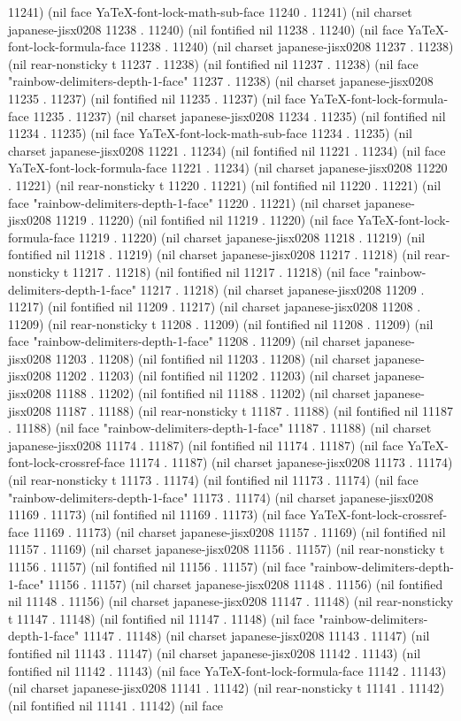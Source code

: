 11241) (nil face YaTeX-font-lock-math-sub-face 11240 . 11241) (nil charset japanese-jisx0208 11238 . 11240) (nil fontified nil 11238 . 11240) (nil face YaTeX-font-lock-formula-face 11238 . 11240) (nil charset japanese-jisx0208 11237 . 11238) (nil rear-nonsticky t 11237 . 11238) (nil fontified nil 11237 . 11238) (nil face "rainbow-delimiters-depth-1-face" 11237 . 11238) (nil charset japanese-jisx0208 11235 . 11237) (nil fontified nil 11235 . 11237) (nil face YaTeX-font-lock-formula-face 11235 . 11237) (nil charset japanese-jisx0208 11234 . 11235) (nil fontified nil 11234 . 11235) (nil face YaTeX-font-lock-math-sub-face 11234 . 11235) (nil charset japanese-jisx0208 11221 . 11234) (nil fontified nil 11221 . 11234) (nil face YaTeX-font-lock-formula-face 11221 . 11234) (nil charset japanese-jisx0208 11220 . 11221) (nil rear-nonsticky t 11220 . 11221) (nil fontified nil 11220 . 11221) (nil face "rainbow-delimiters-depth-1-face" 11220 . 11221) (nil charset japanese-jisx0208 11219 . 11220) (nil fontified nil 11219 . 11220) (nil face YaTeX-font-lock-formula-face 11219 . 11220) (nil charset japanese-jisx0208 11218 . 11219) (nil fontified nil 11218 . 11219) (nil charset japanese-jisx0208 11217 . 11218) (nil rear-nonsticky t 11217 . 11218) (nil fontified nil 11217 . 11218) (nil face "rainbow-delimiters-depth-1-face" 11217 . 11218) (nil charset japanese-jisx0208 11209 . 11217) (nil fontified nil 11209 . 11217) (nil charset japanese-jisx0208 11208 . 11209) (nil rear-nonsticky t 11208 . 11209) (nil fontified nil 11208 . 11209) (nil face "rainbow-delimiters-depth-1-face" 11208 . 11209) (nil charset japanese-jisx0208 11203 . 11208) (nil fontified nil 11203 . 11208) (nil charset japanese-jisx0208 11202 . 11203) (nil fontified nil 11202 . 11203) (nil charset japanese-jisx0208 11188 . 11202) (nil fontified nil 11188 . 11202) (nil charset japanese-jisx0208 11187 . 11188) (nil rear-nonsticky t 11187 . 11188) (nil fontified nil 11187 . 11188) (nil face "rainbow-delimiters-depth-1-face" 11187 . 11188) (nil charset japanese-jisx0208 11174 . 11187) (nil fontified nil 11174 . 11187) (nil face YaTeX-font-lock-crossref-face 11174 . 11187) (nil charset japanese-jisx0208 11173 . 11174) (nil rear-nonsticky t 11173 . 11174) (nil fontified nil 11173 . 11174) (nil face "rainbow-delimiters-depth-1-face" 11173 . 11174) (nil charset japanese-jisx0208 11169 . 11173) (nil fontified nil 11169 . 11173) (nil face YaTeX-font-lock-crossref-face 11169 . 11173) (nil charset japanese-jisx0208 11157 . 11169) (nil fontified nil 11157 . 11169) (nil charset japanese-jisx0208 11156 . 11157) (nil rear-nonsticky t 11156 . 11157) (nil fontified nil 11156 . 11157) (nil face "rainbow-delimiters-depth-1-face" 11156 . 11157) (nil charset japanese-jisx0208 11148 . 11156) (nil fontified nil 11148 . 11156) (nil charset japanese-jisx0208 11147 . 11148) (nil rear-nonsticky t 11147 . 11148) (nil fontified nil 11147 . 11148) (nil face "rainbow-delimiters-depth-1-face" 11147 . 11148) (nil charset japanese-jisx0208 11143 . 11147) (nil fontified nil 11143 . 11147) (nil charset japanese-jisx0208 11142 . 11143) (nil fontified nil 11142 . 11143) (nil face YaTeX-font-lock-formula-face 11142 . 11143) (nil charset japanese-jisx0208 11141 . 11142) (nil rear-nonsticky t 11141 . 11142) (nil fontified nil 11141 . 11142) (nil face 